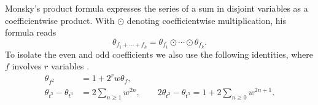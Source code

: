 \documentclass[11pt,a4paper,reqno]{amsart}
\numberwithin{equation}{section}
\theoremstyle{plain}
\begin{document}
Monsky's product formula expresses the series of a sum in disjoint variables as a coefficientwise product. With $\odot$ denoting coefficientwise multiplication, his formula reads \cite[Theorem~1.6]{Mtrans}
\begin{equation}\label{eq:hadamard}
 \theta_{f_1+\cdots+f_k}=\theta_{f_1}\odot\cdots\odot\theta_{f_k}.
\end{equation}
To isolate the even and odd coefficients we also use the following identities, where $f$ involves $r$ variables \cite[Theorem~1.8 and Lemma~1.9]{Mtrans}.
\begin{align}
 \theta_{f^2}&=1+2^r w\theta_f,\label{eq:square-theta}\\
 \theta_{t^5}-\theta_{t^3}&=2\sum_{n\ge1}w^{2n},\qquad
 2\theta_{t^3}-\theta_{t^5}=1+2\sum_{n\ge0}w^{2n+1}.
 \label{eq:parities}
\end{align}
\end{document}
